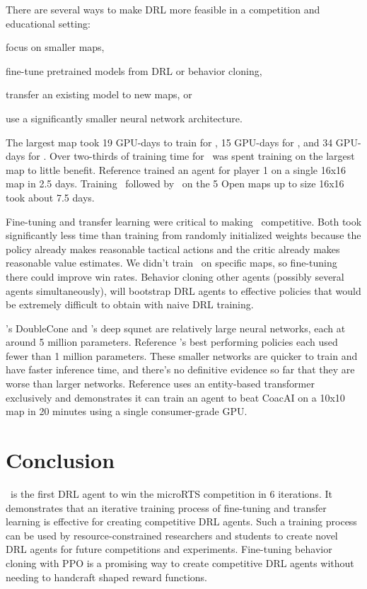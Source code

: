\documentclass[conference]{IEEEtran}
\begin{document}
There are several ways to make DRL more feasible in a competition and educational setting:
\begin{inparaenum}[(1)]
    \item focus on smaller maps,
    \item fine-tune pretrained models from DRL or behavior cloning,
    \item transfer an existing model to new maps, or
    \item use a significantly smaller neural network architecture.
\end{inparaenum}
The largest map took 19 GPU-days to train for \agentName, 15 GPU-days for \bcAgent, and
34 GPU-days for \bcPPOAgent. Over two-thirds of training time for \bcPPOAgent\ was spent
training on the largest map to little benefit. Reference
\cite{DBLP:journals/corr/abs-2105-13807} trained an agent for player 1 on a single 16x16
map in 2.5 days. Training \bcAgent\ followed by \bcPPOAgent\ on the 5 Open maps up to
size 16x16 took about 7.5 days.

Fine-tuning and transfer learning were critical to making \agentName\ competitive. Both
took significantly less time than training from randomly initialized weights because the
policy already makes reasonable tactical actions and the critic already makes reasonable
value estimates. We didn't train
\bcPPOAgent\ on specific maps, so fine-tuning there could improve win rates. Behavior
cloning other agents (possibly several agents simultaneously), will bootstrap DRL agents
to effective policies that would be extremely difficult to obtain with naive DRL
training.

\agentName's DoubleCone and \bcPPOAgent's deep squnet are relatively large neural
networks, each at around 5 million parameters. Reference
\cite{DBLP:journals/corr/abs-2105-13807}'s best performing policies each used fewer
than 1 million parameters. These smaller networks are quicker to train and have faster
inference time, and there's no definitive evidence so far that they are worse than
larger networks. Reference 
\cite{Winter2023} uses an entity-based transformer exclusively and demonstrates
it can train an agent to beat CoacAI on a 10x10 map in 20 minutes using a single
consumer-grade GPU.

\section{Conclusion}
\agentName\ is the first DRL agent to win the microRTS competition in 6 iterations. It demonstrates that
an iterative training process of fine-tuning and transfer learning is effective for
creating competitive DRL agents. Such a training process can be used by
resource-constrained researchers and students to create novel DRL agents for future
competitions and experiments. Fine-tuning behavior cloning with PPO is a promising way
to create competitive DRL agents without needing to handcraft shaped reward functions.
\end{document}
